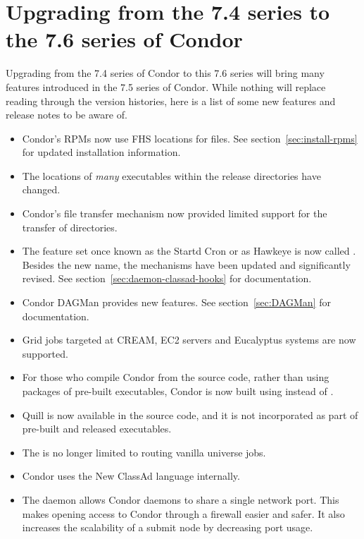 \section{\label{sec:gotchas}Upgrading from the 7.4 series to the 7.6 series of Condor}

Upgrading from the 7.4 series of Condor to this 7.6 series will
bring many features introduced in the 7.5 series of Condor.
While nothing will replace reading through the version histories,
here is a list of some new features and release notes to
be aware of.

\begin{itemize}

\item  Condor's RPMs now use FHS locations for files.
See section~\ref{sec:install-rpms} for updated installation information. 

\item  The locations of \emph{many} executables within the release directories
have changed.

\item  Condor's file transfer mechanism now provided limited support 
for the transfer of directories.

\item  The feature set once known as the Startd Cron or as Hawkeye
is now called .  Besides the new name,
the mechanisms have been updated and significantly revised.
See section~\ref{sec:daemon-classad-hooks} for documentation.

\item  Condor DAGMan provides new features.
See section~\ref{sec:DAGMan} for documentation.

\item  Grid jobs targeted at CREAM, EC2 servers and Eucalyptus systems
 are now supported.

\item  For those who compile Condor from the source code,
rather than using packages of pre-built executables, 
Condor is now built using  instead of .

\item  Quill is now available in the source code, 
and it is not incorporated as part of pre-built and released executables.

\item  The  is no longer limited to routing vanilla
universe jobs.

\item  Condor uses the New ClassAd language internally.

\item  The  daemon allows Condor daemons 
to share a single network port. 
This makes opening access to Condor through a firewall easier and safer. 
It also increases the scalability of a submit node by decreasing port usage.

\end{itemize}

